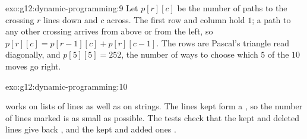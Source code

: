 \begin{solution}{exo:g12:dynamic-programming:9}
Let $p[r][c]$ be the number of paths to the crossing $r$ lines down and $c$ across. The first row and column hold
$1$; a path to any other crossing arrives from above or from the left, so $p[r][c] = p[r - 1][c] + p[r][c - 1]$. The
rows are Pascal's triangle read diagonally, and $p[5][5] = 252$, the number of ways to choose which $5$ of the $10$
moves go right.
\end{solution}

\begin{solution}{exo:g12:dynamic-programming:10}
\smallskip\noindent\hspace*{2em}

\noindent\hspace*{4em}

\noindent\hspace*{4em}

\noindent\hspace*{4em}

\noindent\hspace*{6em}

\noindent\hspace*{8em}

\noindent\hspace*{8em}

\noindent\hspace*{6em}

\noindent\hspace*{8em}

\noindent\hspace*{8em}

\noindent\hspace*{6em}

\noindent\hspace*{8em}

\noindent\hspace*{8em}

\noindent\hspace*{4em}

\smallskip\noindent {} works on lists of lines as well as on strings. The lines kept form a , so the number of lines marked is as small as possible. The tests check that the kept and deleted
lines give back , and the kept and added ones .
\end{solution}

